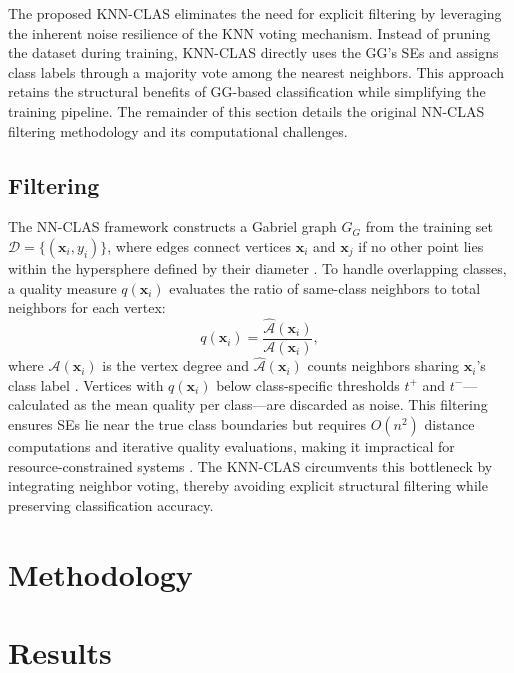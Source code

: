\documentclass[conference]{IEEEtran}
\begin{document}
The proposed KNN-CLAS eliminates the need for explicit filtering by leveraging the inherent noise resilience of the KNN voting mechanism. Instead of pruning the dataset during training, KNN-CLAS directly uses the GG's SEs and assigns class labels through a majority vote among the nearest neighbors. This approach retains the structural benefits of GG-based classification while simplifying the training pipeline. The remainder of this section details the original NN-CLAS filtering methodology and its computational challenges.

\subsection{Filtering}

The NN-CLAS framework constructs a Gabriel graph \( G_G \) from the training set \( \mathcal{D} = \{(\mathbf{x}_i, y_i)\} \), where edges connect vertices \( \mathbf{x}_i \) and \( \mathbf{x}_j \) if no other point lies within the hypersphere defined by their diameter \cite{torres2016}. To handle overlapping classes, a quality measure \( q(\mathbf{x}_i) \) evaluates the ratio of same-class neighbors to total neighbors for each vertex:
\[
q(\mathbf{x}_i) = \frac{\hat{\mathcal{A}}(\mathbf{x}_i)}{\mathcal{A}(\mathbf{x}_i)},
\]
where \( \mathcal{A}(\mathbf{x}_i) \) is the vertex degree and \( \hat{\mathcal{A}}(\mathbf{x}_i) \) counts neighbors sharing \( \mathbf{x}_i \)'s class label \cite{souza2019}. Vertices with \( q(\mathbf{x}_i) \) below class-specific thresholds \( t^+ \) and \( t^- \)—calculated as the mean quality per class—are discarded as noise. This filtering ensures SEs lie near the true class boundaries but requires \( O(n^2) \) distance computations and iterative quality evaluations, making it impractical for resource-constrained systems \cite{arias2021}. The KNN-CLAS circumvents this bottleneck by integrating neighbor voting, thereby avoiding explicit structural filtering while preserving classification accuracy.

\section{Methodology}

\section{Results}


\end{document}
